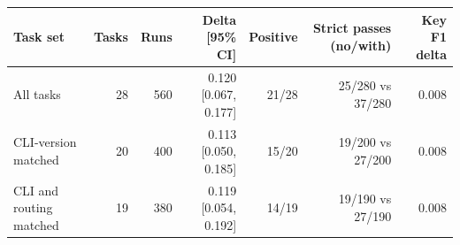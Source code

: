 \begin{tabular}{lrrrrrr}
\toprule
Task set & Tasks & Runs & Delta [95\% CI] & Positive & Strict passes (no/with) & Key F1 delta \\
\midrule
All tasks & 28 & 560 & 0.120 [0.067, 0.177] & 21/28 & 25/280 vs 37/280 & 0.008 \\
CLI-version matched & 20 & 400 & 0.113 [0.050, 0.185] & 15/20 & 19/200 vs 27/200 & 0.008 \\
CLI and routing matched & 19 & 380 & 0.119 [0.054, 0.192] & 14/19 & 19/190 vs 27/190 & 0.008 \\
\bottomrule
\end{tabular}
